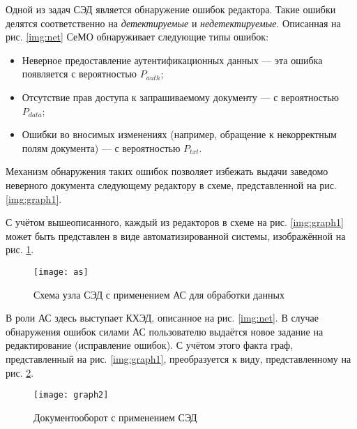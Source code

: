 Одной из задач СЭД является обнаружение ошибок редактора. Такие ошибки делятся соответственно на \textit{детектируемые} и \textit{недетектируемые}.
Описанная на рис. \ref{img:net} СеМО обнаруживает следующие типы ошибок:
\begin{itemize}
  \item Неверное предоставление аутентификационных данных --- эта ошибка появляется с вероятностью $P_{auth}$;
  \item Отсутствие прав доступа к запрашиваемому документу --- с вероятностью $P_{data}$;
  \item Ошибки во вносимых изменениях (например, обращение к некорректным полям документа) --- с вероятностью $P_{txt}$.
\end{itemize}

Механизм обнаружения таких ошибок позволяет избежать выдачи заведомо неверного документа следующему редактору в схеме, представленной на рис. \ref{img:graph1}.

\vspace{\baselineskip}
С учётом вышеописанного, каждый из редакторов в схеме на рис. \ref{img:graph1} может быть представлен в виде автоматизированной системы, изображённой на рис. \ref{img:as}.

\begin{figure}[h]
  \centering
  \texttt{[image: as]}
  \caption{Схема узла СЭД с применением АС для обработки данных}
  \label{img:as}
\end{figure}

В роли АС здесь выступает КХЭД, описанное на рис. \ref{img:net}. В случае обнаружения ошибок силами АС пользователю выдаётся новое задание на редактирование (исправление ошибок). С учётом этого факта граф, представленный на рис. \ref{img:graph1}, преобразуется к виду, представленному на рис. \ref{img:graph2}.

\begin{figure}[h!]
  \centering
  \texttt{[image: graph2]}
  \caption{Документооборот с применением СЭД}
  \label{img:graph2}
\end{figure}